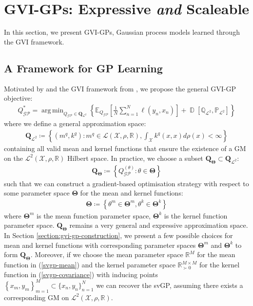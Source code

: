 \documentclass{article}
\newcommand{\D}{\operatorname{\mathbb{D}}}
\newcommand{\GP}{\operatorname{\mathcal{GP}}}
\DeclareMathOperator*{\argmin}{arg\,min}
\numberwithin{equation}{section}
\begin{document}
\newpage
\section{GVI-GPs: Expressive \textit{and} Scaleable}
In this section, we present GVI-GPs, Gaussian process models learned through the GVI framework.

\subsection{A Framework for GP Learning}
Motivated by \cite{wild2022generalized} and the GVI framework from \cite{knoblauch2022optimization}, we propose the general GVI-GP objective:
\begin{align}
Q_{\GP}^* = \argmin_{Q_{\GP} \in \boldsymbol{Q}_{\mathcal{L}^2}} \left\{ \mathbb{E}_{Q_{\GP}}\left[\frac{1}{N}\sum_{n=1}^N \ell(y_n, x_n)\right] + \D\left[\mathbb{Q}_{\mathcal{L}^2}, \mathbb{P}_{\mathcal{L}^2}\right]\right\}
\label{gvi-gp-objective}
\end{align}
where we define a general approximation space:
\begin{align}
    \boldsymbol{Q}_{\mathcal{L}^2} \coloneqq \left\{ 
    \left(m^q, k^q\right): m^q \in \mathcal{L}(\mathcal{X}, \rho, \mathbb{R}), \int_{\mathcal{X}} k^q(x, x)d\rho(x) < \infty
    \right\}
\end{align}
containing all valid mean and kernel functions that ensure the existence of a GM on the $\mathcal{L}^2(\mathcal{X}, \rho, \mathbb{R})$ Hilbert space. In practice, we choose a subset $\boldsymbol{Q}_{\boldsymbol{\Theta}} \subset \boldsymbol{Q}_{\mathcal{L}^2}$:
\begin{align}
    \boldsymbol{Q}_{\boldsymbol{\Theta}} \coloneqq \left\{ 
    Q^{(\theta)}_{\GP}: \theta \in \boldsymbol{\Theta}
    \right\}
\end{align}
such that we can construct a gradient-based optimisation strategy with respect to some parameter space $\boldsymbol{\Theta}$ for the mean and kernel functions:
\begin{align}
    \boldsymbol{\Theta} \coloneqq \left\{\theta^m \in \boldsymbol{\Theta}^m, \theta^k \in \boldsymbol{\Theta}^k \right\}
\end{align}
where $\boldsymbol{\Theta}^m$ is the mean function parameter space, $\boldsymbol{\Theta}^k$ is the kernel function parameter space. $\boldsymbol{Q}_{\boldsymbol{\Theta}}$ remains a very general and expressive approximation space. 
In Section \ref{section:gvi-gp-construction}, we present a few possible choices for mean and kernel functions with corresponding parameter spaces $\boldsymbol{\Theta}^m$ and $\boldsymbol{\Theta}^k$ to form $\boldsymbol{Q}_{\boldsymbol{\Theta}}$. 
Moreover, if we choose the mean parameter space $\mathbb{R}^M$ for the mean function in (\ref{svgp-mean}) and the kernel parameter space $\mathbb{R}^{M\times M}_{\succ 0}$ for the kernel function in (\ref{svgp-covariance}) with inducing points $\left\{x_m, y_m\right\}_{m=1}^{M} \subset \{x_n, y_n\}_{n=1}^{N}$ we can recover the svGP, assuming there exists a corresponding GM on $\mathcal{L}^2(\mathcal{X}, \rho, \mathbb{R})$. 
\end{document}
